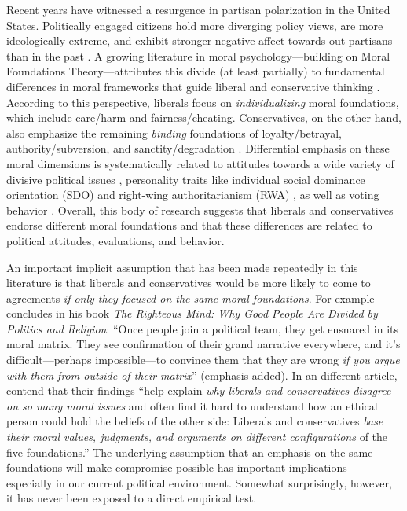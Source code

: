 \documentclass[12pt,]{article}
\begin{document}
Recent years have witnessed a resurgence in partisan polarization in the
United States. Politically engaged citizens hold more diverging policy
views, are more ideologically extreme, and exhibit stronger negative
affect towards out-partisans than in the past
\citep{hetherington2001resurgent, abramowitz2008polarization, iyengar2012affect, mason2014disrespectfully, huddy2015expressive, iyengar2015fear}.
A growing literature in moral psychology---building on Moral Foundations
Theory---attributes this divide (at least partially) to fundamental
differences in moral frameworks that guide liberal and conservative
thinking \citep[c.f.,][]{haidt2012righteous}. According to this
perspective, liberals focus on \emph{individualizing} moral foundations,
which include care/harm and fairness/cheating. Conservatives, on the
other hand, also emphasize the remaining \emph{binding} foundations of
loyalty/betrayal, authority/subversion, and sanctity/degradation
\citep{haidt2007morality, graham2009liberals}. Differential emphasis on
these moral dimensions is systematically related to attitudes towards a
wide variety of divisive political issues
\citep[e.g.][]{koleva2012tracing, kertzer2014moral, low2015moral},
personality traits like individual social dominance orientation (SDO)
and right-wing authoritarianism (RWA) \citep{federico2013mapping}, as
well as voting behavior \citep{franks2015using}. Overall, this body of
research suggests that liberals and conservatives endorse different
moral foundations and that these differences are related to political
attitudes, evaluations, and behavior.

An important implicit assumption that has been made repeatedly in this
literature is that liberals and conservatives would be more likely to
come to agreements \emph{if only they focused on the same moral
foundations}. For example \citet[365]{haidt2012righteous} concludes in
his book \emph{The Righteous Mind: Why Good People Are Divided by
Politics and Religion}: ``Once people join a political team, they get
ensnared in its moral matrix. They see confirmation of their grand
narrative everywhere, and it's difficult---perhaps impossible---to
convince them that they are wrong \emph{if you argue with them from
outside of their matrix}'' (emphasis added). In an different article,
\citet[1040]{graham2009liberals} contend that their findings ``help
explain \emph{why liberals and conservatives disagree on so many moral
issues} and often find it hard to understand how an ethical person could
hold the beliefs of the other side: Liberals and conservatives
\emph{base their moral values, judgments, and arguments on different
configurations} of the five foundations.'' The underlying assumption
that an emphasis on the same foundations will make compromise possible
has important implications---especially in our current political
environment. Somewhat surprisingly, however, it has never been exposed
to a direct empirical test.
\end{document}
